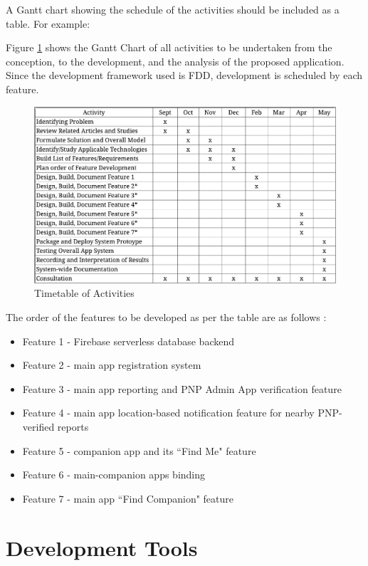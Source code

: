 A Gantt chart showing the schedule of the activities should be included as a table. For example:

Figure \ref{fig:timetableactivities} shows the Gantt Chart of all activities to be undertaken from the conception, to the development, and the analysis of the proposed application. Since the development framework used is FDD, development is scheduled by each feature.

\begin{figure}[!h]
    \centering
    \includegraphics[width=\textwidth]{figures/Chapter3/Chapt3_calendar.jpg}
    \caption{Timetable of Activities}
    \label{fig:timetableactivities}
\end{figure}

The order of the features to be developed as per the table are as follows :
\begin{itemize}
    \item Feature 1 - Firebase serverless database backend
    \item Feature 2 - main app registration system
    \item Feature 3 - main app reporting and PNP Admin App verification feature
    \item Feature 4 - main app location-based notification feature for nearby PNP-verified reports
    \item Feature 5 - companion app and its ``Find Me" feature
    \item Feature 6 - main-companion apps binding
    \item Feature 7 - main app ``Find Companion" feature
\end{itemize}

\section{Development Tools}
